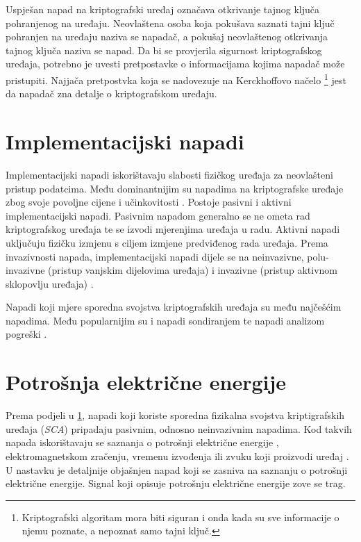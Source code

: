\documentclass[times, utf8, numeric, diplomski]{fer}
\begin{document}
Uspješan napad na kriptografski uređaj označava otkrivanje tajnog ključa pohranjenog na uređaju. Neovlaštena osoba koja pokušava saznati tajni ključ pohranjen na uređaju naziva se napadač, a pokušaj neovlaštenog otkrivanja tajnog ključa naziva se napad. Da bi se provjerila sigurnost kriptografskog uređaja, potrebno je uvesti pretpostavke o informacijama kojima napadač može pristupiti. Najjača pretpostvka koja se nadovezuje na Kerckhoffovo načelo \footnote{Kriptografski algoritam mora biti siguran i onda kada su sve informacije o njemu poznate, a nepoznat samo tajni ključ.} jest da napadač zna detalje o kriptografskom uređaju.

\section{Implementacijski napadi}
\label{sec:implatt}

Implementacijski napadi iskorištavaju slabosti fizičkog uređaja za neovlašteni pristup podatcima. Među dominantnijim su napadima na kriptografske uređaje zbog svoje povoljne cijene i učinkovitosti \citep{picekphd}. Postoje pasivni i aktivni implementacijski napadi. Pasivnim napadom generalno se ne ometa rad kriptografskog uređaja te se izvodi mjerenjima uređaja u radu. Aktivni napadi uključuju fizičku izmjenu s ciljem izmjene predviđenog rada uređaja. Prema invazivnosti napada, implementacijski napadi dijele se na neinvazivne, polu-invazivne (pristup vanjskim dijelovima uređaja) i invazivne (pristup aktivnom sklopovlju uređaja) \citep{picekphd}. 

Napadi koji mjere sporedna svojstva kriptografskih uređaja  su među najčešćim napadima. Među popularnijim su i napadi sondiranjem  \citep{mangard2008power} te napadi analizom pogreški .


\section{Potrošnja električne energije}
Prema podjeli u \ref{sec:implatt}, napadi koji koriste sporedna fizikalna svojstva kriptigrafskih uređaja (\textit{SCA}) pripadaju pasivnim, odnosno neinvazivnim napadima. Kod takvih napada iskorištavaju se saznanja o potrošnji električne energije , elektromagnetskom zračenju, vremenu izvođenja ili zvuku koji proizvodi uređaj \citep{picekphd}. U nastavku je detaljnije objašnjen napad koji se zasniva na saznanju o potrošnji električne energije. Signal koji opisuje potrošnju električne energije zove se trag.
\end{document}
